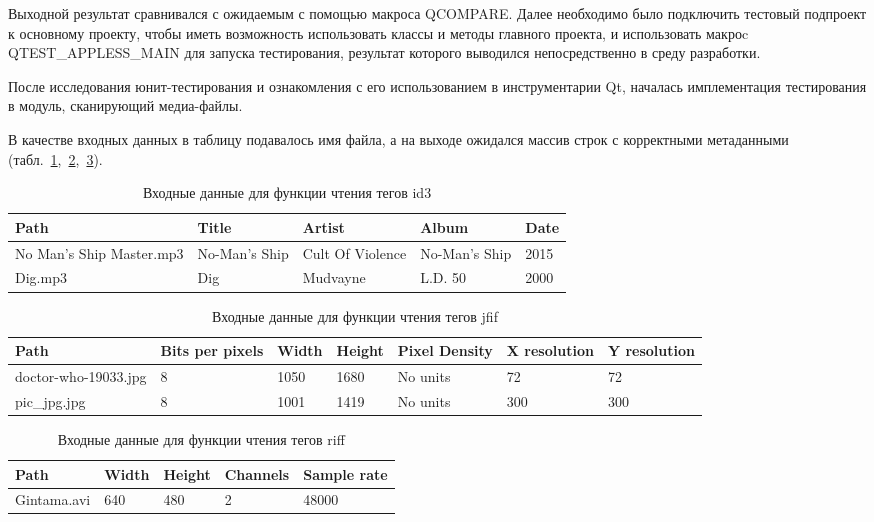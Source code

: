 Выходной результат сравнивался с ожидаемым с помощью макроса QCOMPARE. Далее необходимо было подключить тестовый подпроект к основному проекту, чтобы иметь возможность использовать классы и методы главного проекта, и использовать макроc QTEST\_APPLESS\_MAIN для запуска тестирования, результат которого выводился непосредственно в среду разработки.
 
После исследования юнит-тестирования и ознакомления с его использованием в инструментарии Qt, началась имплементация тестирования в модуль, сканирующий медиа-файлы.

В качестве входных данных в таблицу подавалось имя файла, а на выходе ожидался массив строк с корректными метаданными (табл.~\ref{tab:2},~\ref{tab:3},~\ref{tab:4}).

\begin{table}[h!]
\caption{ Входные данные для функции чтения тегов id3 }
\label{tab:2}
\begin{center}
\begin{tabularx}{\linewidth}{|X|X|X|X|X|}
\hline
Path & Title & Artist & Album & Date \\
\hline
No Man's Ship Master.mp3 & No-Man's Ship & Cult Of Violence & No-Man's Ship & 2015 \\
\hline
Dig.mp3 & Dig & Mudvayne & L.D. 50 & 2000 \\
\hline
\end{tabularx}
\end{center}
\end{table}

\begin{table}[h!]
\caption{ Входные данные для функции чтения тегов jfif }
\label{tab:3}
\begin{center}
\begin{tabularx}{\linewidth}{|X|X|X|X|X|X|X|}
\hline
Path & Bits per pixels & Width & Height & Pixel Density & X resolution & Y resolution \\
\hline
doctor-who-19033.jpg & 8 & 1050 & 1680 & No units & 72 & 72 \\
\hline
pic\_jpg.jpg & 8 & 1001 & 1419 & No units & 300 & 300 \\
\hline
\end{tabularx}
\end{center}
\end{table}

\begin{table}[h!]
\caption{ Входные данные для функции чтения тегов riff }
\label{tab:4}
\begin{center}
\begin{tabularx}{\linewidth}{|X|X|X|X|X|}
\hline
Path & Width & Height & Channels & Sample rate \\
\hline
Gintama.avi & 640 & 480 & 2 & 48000 \\
\hline
\end{tabularx}
\end{center}
\end{table}

